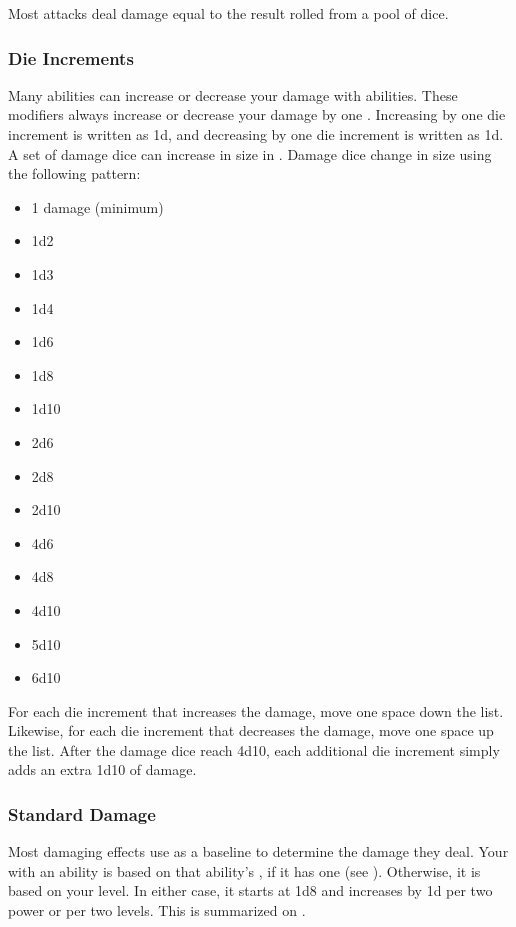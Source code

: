         Most attacks deal damage equal to the result rolled from a pool of dice.

        \subsubsection{Die Increments}\label{Die Increments}
            Many abilities can increase or decrease your damage with abilities.
            These modifiers always increase or decrease your damage by one .
            Increasing by one die increment is written as \plus1d, and decreasing by one die increment is written as \minus1d.
            A set of damage dice can increase in size in .
            Damage dice change in size using the following pattern:
            \begin{itemize}
                \item 1 damage (minimum)
                \item 1d2
                \item 1d3
                \item 1d4
                \item 1d6
                \item 1d8
                \item 1d10
                \item 2d6
                \item 2d8
                \item 2d10
                \item 4d6
                \item 4d8
                \item 4d10
                \item 5d10
                \item 6d10
            \end{itemize}

            For each die increment that increases the damage, move one space down the list.
            Likewise, for each die increment that decreases the damage, move one space up the list.
            After the damage dice reach 4d10, each additional die increment simply adds an extra 1d10 of damage.

        \subsubsection{Standard Damage}\label{Standard Damage}
            Most damaging effects use  as a baseline to determine the damage they deal.
            Your  with an ability is based on that ability's , if it has one (see ).
            Otherwise, it is based on your level.
            In either case, it starts at 1d8 and increases by \plus1d per two power or per two levels.
            This is summarized on .

